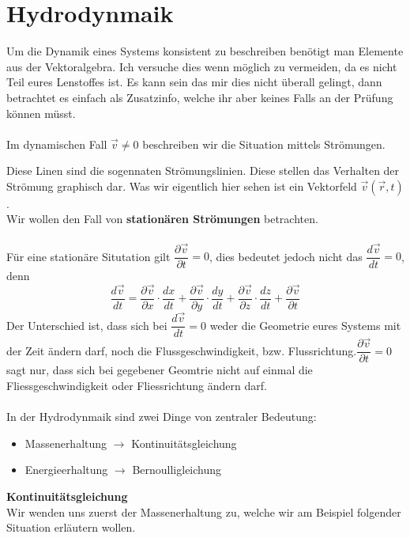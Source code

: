 \documentclass[12pt]{article}
\begin{document}
\section{Hydrodynmaik}
Um die Dynamik eines Systems konsistent zu beschreiben benötigt man Elemente aus der Vektoralgebra. Ich versuche dies wenn möglich zu vermeiden, da es nicht Teil eures Lenstoffes ist. Es kann sein das mir dies nicht überall gelingt, dann betrachtet es einfach als Zusatzinfo, welche ihr aber keines Falls an der Prüfung können müsst.
\\
\\
Im dynamischen Fall $\vec{v} \ne 0$ beschreiben wir die Situation mittels Strömungen.
 \begin{figure}[H]
  \label{fig:1teil}
\end{figure}
Diese Linen sind die sogennaten Strömungslinien. Diese stellen das Verhalten der Strömung graphisch dar. Was wir eigentlich hier sehen ist ein Vektorfeld $\vec{v}(\vec{r},t)$.\\
Wir wollen den Fall von \textbf{stationären Strömungen} betrachten.\\
\\
Für eine stationäre Situtation gilt $\dfrac{\partial \vec{v}}{\partial t} = 0$, dies bedeutet jedoch nicht das $\dfrac{d\vec{ v}}{dt} = 0$, denn
\begin{equation}
\dfrac{d\vec{v}}{dt} = \dfrac{\partial \vec{v}}{\partial x} \cdot \dfrac{dx}{dt} + \dfrac{\partial \vec{v}}{\partial y} \cdot \dfrac{dy}{dt} + \dfrac{\partial \vec{v}}{\partial z} \cdot \dfrac{dz}{dt} + \dfrac{\partial \vec{v}}{\partial t}
\end{equation}
Der Unterschied ist, dass sich bei $\dfrac{d\vec{v}}{dt} = 0$ weder die Geometrie eures Systems mit der Zeit ändern darf, noch die Flussgeschwindigkeit, bzw. Flussrichtung.$\dfrac{\partial \vec{v}}{\partial t} = 0$ sagt nur, dass sich bei gegebener Geomtrie nicht auf einmal die Fliessgeschwindigkeit oder Fliessrichtung ändern darf.
\\
\\
In der Hydrodynmaik sind zwei Dinge von zentraler Bedeutung:
\begin{itemize}
\item Massenerhaltung $\rightarrow$ Kontinuitätsgleichung
\item Energieerhaltung $\rightarrow$ Bernoulligleichung
\end{itemize}
\textbf{Kontinuitätsgleichung}
\\
Wir wenden uns zuerst der Massenerhaltung zu, welche wir am Beispiel folgender Situation erläutern wollen.
\end{document}
